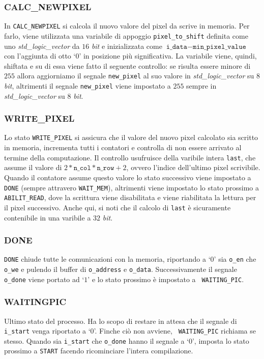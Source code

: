 \documentclass[11pt, a4paper]{article}
\begin{document}
\subsubsection{CALC\_NEWPIXEL}
In \texttt{CALC\_NEWPIXEL} si calcola il nuovo valore del pixel da scrive in memoria.
Per farlo, viene utilizzata una variabile di appoggio \texttt{pixel\_to\_shift} definita come uno \textit{std\_logic\_vector} da $16$ \textit{bit} e inizializzata come $\texttt{i\_data}-\texttt{min\_pixel\_value}$ con l’aggiunta di otto `$0$' in posizione più significativa.
La variabile viene, quindi, shiftata e su di essa viene fatto il seguente controllo: se risulta essere minore di $255$ allora aggiorniamo il segnale \texttt{new\_pixel} al suo valore in \textit{std\_logic\_vector} su $8$ \textit{bit}, altrimenti il segnale \texttt{new\_pixel} viene impostato a $255$ sempre in \textit{std\_logic\_vector} su $8$ \textit{bit}.

\subsubsection{WRITE\_PIXEL}
Lo stato \texttt{WRITE\_PIXEL} si assicura che il valore del nuovo pixel calcolato sia scritto in memoria, incrementa tutti i contatori e controlla di non essere arrivato al termine della computazione. Il controllo usufruisce della varibile intera \texttt{last}, che assume il valore di $2*\texttt{n\_col}*\texttt{n\_row}+2$, ovvero l'indice dell'ultimo pixel scrivibile. Quando il contatore assume questo valore lo stato successivo viene impostato a \texttt{DONE} (sempre attravero \texttt{WAIT\_MEM}), altrimenti viene impostato lo stato prossimo a \texttt{ABILIT\_READ}, dove la scrittura viene disabilitata e viene riabilitata la lettura per il pixel successivo. Anche qui, si noti che il calcolo di \texttt{last} è sicuramente contenibile in una varibile a $32$ \textit{bit}.

\subsubsection{DONE}
\texttt{DONE} chiude tutte le comunicazioni con la memoria, riportando a `$0$' sia \texttt{o\_en} che \texttt{o\_we} e pulendo il buffer di \texttt{o\_address} e \texttt{o\_data}.
Successivamente il segnale \texttt{o\_done} viene portato ad `$1$' e lo stato prossimo è impostato a \texttt{ WAITING\_PIC}.


\subsubsection{WAITINGPIC}
Ultimo stato del processo. Ha lo scopo di restare in attesa che il segnale di \texttt{i\_start} venga riportato a `$0$'. Finche ciò non avviene, \texttt{ WAITING\_PIC} richiama se stesso. Quando sia \texttt{i\_start} che \texttt{o\_done} hanno il segnale a `$0$', imposta lo stato prossimo a \texttt{START} facendo ricominciare l’intera compilazione.
\end{document}
